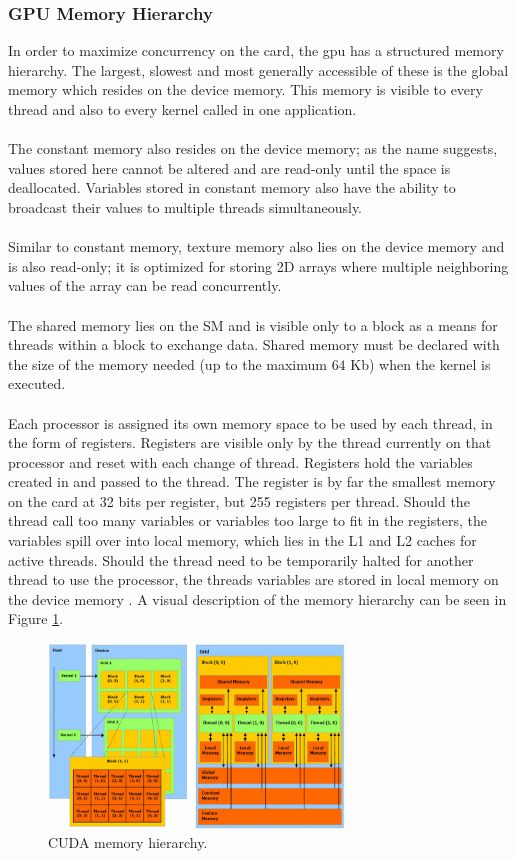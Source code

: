 \subsubsection{GPU Memory Hierarchy}\label{gpu:ssec:mem}
In order to maximize concurrency on the card, the \gls{gpu} has a structured memory hierarchy. The largest, slowest and most generally accessible of these is the global memory which resides on the device memory. This memory is visible to every thread and also to every kernel called in one application. 
\\
\\
The constant memory also resides on the device memory; as the name suggests, values stored here cannot be altered and are read-only until the space is deallocated. Variables stored in constant memory also have the ability to broadcast their values to multiple threads simultaneously.
\\
\\
Similar to constant memory, texture memory also lies on the device memory and is also read-only; it is optimized for storing 2D arrays where multiple neighboring values of the array can be read concurrently.
\\
\\
The shared memory lies on the SM and is visible only to a block as a means for threads within a block to exchange data. Shared memory must be declared with the size of the memory needed (up to the maximum $64$ Kb) when the kernel is executed.
\\
\\
Each processor is assigned its own memory space to be used by each thread, in the form of registers. Registers are visible only by the thread currently on that processor and reset with each change of thread. Registers hold the variables created in and passed to the thread. The register is by far the smallest memory on the card at 32 bits per register, but 255 registers per thread. Should the thread call too many variables or variables too large to fit in the registers, the variables spill over into local memory, which lies in the L1 and L2 caches for active threads. Should the thread need to be temporarily halted for another thread to use the processor, the threads variables are stored in local memory on the device memory \citep{CUDA}. A visual description of the memory hierarchy can be seen in Figure \ref{gpu:img:mem}.
%
\begin{figure}[H]
\centering
 \includegraphics[width=0.7\textwidth]{Images/Cuda_mem_struct.png}
 \caption[]{CUDA memory hierarchy.\footnotemark}
 \label{gpu:img:mem}
\end{figure}
%
